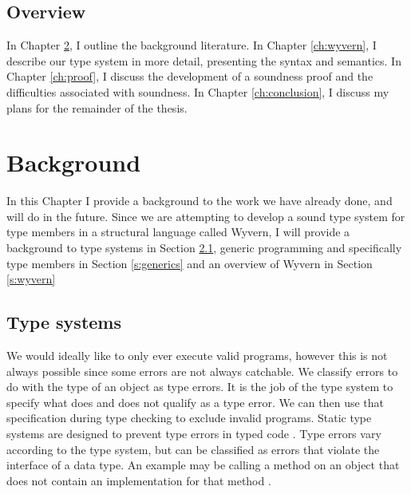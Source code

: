 \documentclass[11pt
              , a4paper
              , twoside
              , openright
              ]{report}
\numberwithin{case}{theorem}
\numberwithin{subcase}{case}
\begin{document}
\section{Overview}

In Chapter \ref{ch:background}, I outline the background literature. In Chapter \ref{ch:wyvern}, I describe our type system in more detail, presenting the syntax and semantics. In Chapter \ref{ch:proof}, I discuss the development of a soundness proof and the difficulties associated with soundness. In Chapter \ref{ch:conclusion}, I discuss my plans for the remainder of the thesis.

\chapter{Background}\label{ch:background}

In this Chapter I provide a background to the work we have already done, and will do in the future. Since we are attempting to develop a sound type system for type members in a structural language called Wyvern, I will provide a background to type systems in Section \ref{s:typesys}, generic programming and specifically type members in Section \ref{s:generics} and an overview of Wyvern in Section \ref{s:wyvern}

\section{Type systems}\label{s:typesys}
We would ideally like to only ever execute valid programs, however this is not always possible since some errors are not always catchable. We classify errors to do with the type of an object as type errors. It is the job of the type system to specify what does and does not qualify as a type error. We can then use that specification during type checking to exclude invalid programs. Static type systems are designed to prevent type errors in typed code \cite{Wright:1994:SAT:191905.191909}. Type errors vary according to the type system, but can be classified as errors that violate the interface of a data type. An example may be calling a method on an object that does not contain an implementation for that method \cite{Wright:1994:SAT:191905.191909}.
\end{document}
